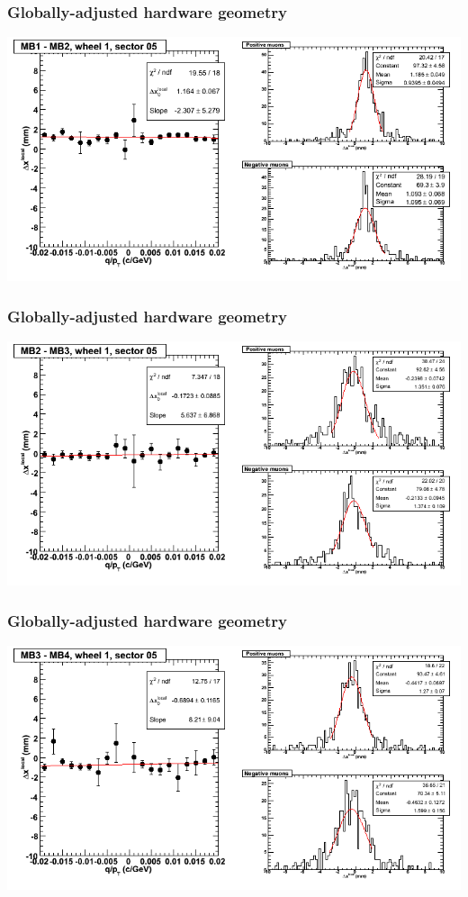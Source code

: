\documentclass[compress]{beamer}
\begin{document}
\begin{frame}
\frametitle{Globally-adjusted hardware geometry}
\includegraphics[width=\linewidth]{NOV4_segdiffs_HW/dt13_resid_D_05_12.png}
\end{frame}

\begin{frame}
\frametitle{Globally-adjusted hardware geometry}
\includegraphics[width=\linewidth]{NOV4_segdiffs_HW/dt13_resid_D_05_23.png}
\end{frame}

\begin{frame}
\frametitle{Globally-adjusted hardware geometry}
\includegraphics[width=\linewidth]{NOV4_segdiffs_HW/dt13_resid_D_05_34.png}
\end{frame}
\end{document}
